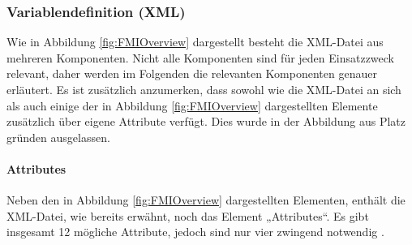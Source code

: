 \subsubsection{Variablendefinition (XML)}\label{sec:Variablendefinition}
Wie in Abbildung \ref{fig:FMIOverview} dargestellt besteht die XML-Datei aus mehreren Komponenten. Nicht alle Komponenten sind für jeden Einsatzzweck relevant, daher werden im Folgenden die relevanten Komponenten genauer erläutert.
\newline
Es ist zusätzlich anzumerken, dass sowohl wie die XML-Datei an sich als auch einige der in Abbildung \ref{fig:FMIOverview} dargestellten Elemente zusätzlich über eigene Attribute verfügt. Dies wurde in der Abbildung aus Platz gründen ausgelassen.

\paragraph{Attributes}\label{sec:AttributeFMU}
\noindent Neben den in Abbildung \ref{fig:FMIOverview} dargestellten Elementen, enthält die XML-Datei, wie bereits erwähnt, noch das Element „Attributes“. Es gibt insgesamt 12 mögliche Attribute, jedoch sind nur vier zwingend notwendig \cite[S.33]{25}.
